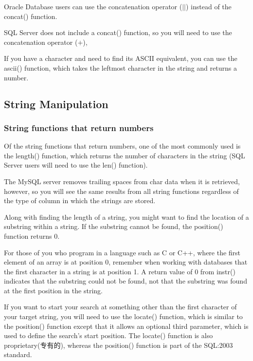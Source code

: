 \begin{tcolorbox}
    Oracle Database users can use the concatenation operator ($||$) instead of the concat() function.

    SQL Server does not include a concat() function, so you will need to use the concatenation operator ($+$),
\end{tcolorbox}

If you have a character and need to find its ASCII equivalent, you can use the ascii() function, which takes the leftmost character in the string and returns a number.

\subsection{String Manipulation}

\subsubsection*{String functions that return numbers}
Of the string functions that return numbers, one of the most commonly used is the length() function, which returns the number of characters in the string (SQL Server users will need to use the len() function).

The MySQL server removes trailing spaces from char data when it is retrieved, however, so you will see the same results from all string functions regardless of the type of column in which the strings are stored.

Along with finding the length of a string, you might want to find the location of a substring within a string. If the substring cannot be found, the position() function returns 0.

\begin{tcolorbox}
    For those of you who program in a language such as C or C++, where the first element of an array is at position 0, remember when working with databases that the first character in a string is at position 1. A return value of 0 from instr() indicates that the substring could not be found, not that the substring was found at the first position in the string.
\end{tcolorbox}

If you want to start your search at something other than the first character of your target string, you will need to use the locate() function, which is similar to the position() function except that it allows an optional third parameter, which is used to define the search's start position. The locate() function is also proprietary(专有的), whereas the position() function is part of the SQL:2003 standard.

